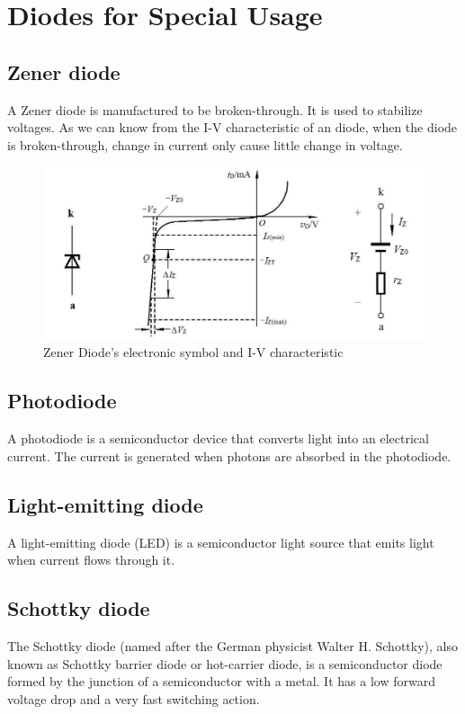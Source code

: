 \section{Diodes for Special Usage}

\subsection{Zener diode}

A Zener diode is manufactured to be broken-through. It is used to stabilize voltages. As we can know from the I-V characteristic of an diode, when the diode is broken-through, change in current only cause little change in voltage.

\begin{figure}[H]
  \centering
  \includegraphics[width=0.5\linewidth]{figures/Zener-diode-1}
  \caption{Zener Diode's electronic symbol and I-V characteristic}
\end{figure}

\subsection{Photodiode}

A photodiode is a semiconductor device that converts light into an electrical current. The current is generated when photons are absorbed in the photodiode.

\subsection{Light-emitting diode}

A light-emitting diode (LED) is a semiconductor light source that emits light when current flows through it.

\subsection{Schottky diode}

The Schottky diode (named after the German physicist Walter H. Schottky), also known as Schottky barrier diode or hot-carrier diode, is a semiconductor diode formed by the junction of a semiconductor with a metal. It has a low forward voltage drop and a very fast switching action.

